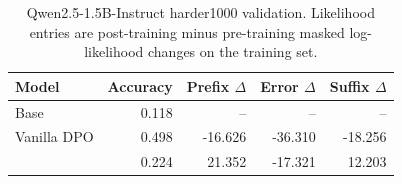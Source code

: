 \begin{table}[h]
\caption{Qwen2.5-1.5B-Instruct harder1000 validation. Likelihood entries are post-training minus pre-training masked log-likelihood changes on the training set.}
\label{tab:qwen15b-details}
\begin{center}
\begin{tabular}{lrrrr}
\toprule
Model & Accuracy & Prefix $\Delta$ & Error $\Delta$ & Suffix $\Delta$ \\
\midrule
Base & 0.118 & -- & -- & -- \\
Vanilla DPO & 0.498 & -16.626 & -36.310 & -18.256 \\
\cmdpo{} & 0.224 & 21.352 & -17.321 & 12.203 \\
\bottomrule
\end{tabular}
\end{center}
\end{table}
